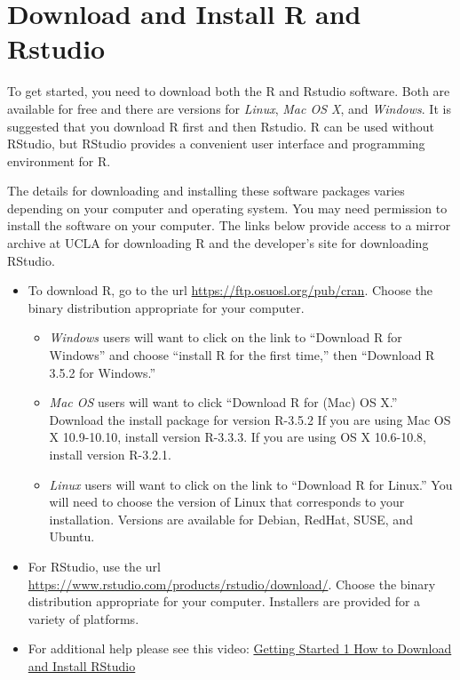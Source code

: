 \documentclass[
]{book}
\providecommand{\tightlist}{%
  \setlength{\itemsep}{0pt}\setlength{\parskip}{0pt}}
\begin{document}
\hypertarget{download-and-install-r-and-rstudio}{%
\section{Download and Install R and Rstudio}\label{download-and-install-r-and-rstudio}}

To get started, you need to download both the R and Rstudio software. Both are available for free and there are versions for \emph{Linux}, \emph{Mac OS X}, and \emph{Windows}. It is suggested that you download R first and then Rstudio. R can be used without RStudio, but RStudio provides a convenient user interface and programming environment for R.

The details for downloading and installing these software packages varies depending on your computer and operating system. You may need permission to install the software on your computer. The links below provide access to a mirror archive at UCLA for downloading R and the developer's site for downloading RStudio.

\begin{itemize}
\item
  To download R, go to the url \url{https://ftp.osuosl.org/pub/cran}. Choose the binary distribution appropriate for your computer.

  \begin{itemize}
  \tightlist
  \item
    \emph{Windows} users will want to click on the link to ``Download R for Windows'' and choose ``install R for the first time,'' then ``Download R 3.5.2 for Windows.''
  \item
    \emph{Mac OS} users will want to click ``Download R for (Mac) OS X.'' Download the install package for version R-3.5.2 If you are using Mac OS X 10.9-10.10, install version R-3.3.3. If you are using OS X 10.6-10.8, install version R-3.2.1.
  \item
    \emph{Linux} users will want to click on the link to ``Download R for Linux.'' You will need to choose the version of Linux that corresponds to your installation. Versions are available for Debian, RedHat, SUSE, and Ubuntu.
  \end{itemize}
\item
  For RStudio, use the url \url{https://www.rstudio.com/products/rstudio/download/}. Choose the binary distribution appropriate for your computer. Installers are provided for a variety of platforms.
\item
  For additional help please see this video: \href{https://ucr.yuja.com/V/Video?v=2365045\&node=8476457\&a=437885577\&autoplay=1}{Getting Started 1 \textbar{} How to Download and Install RStudio}
\end{itemize}
\end{document}

